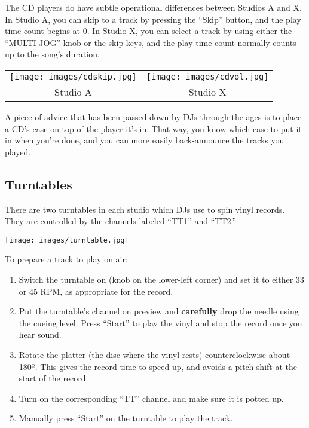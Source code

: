 \documentclass{witrman}
\begin{document}
The CD players do have subtle operational differences between Studios A and X.
In Studio A, you can skip to a track by pressing the ``Skip'' button, and the
play time count begins at 0.  In Studio X, you can select a track by using either the
``MULTI JOG'' knob or the skip keys, and the play time count normally counts up to the
song's duration.  

\begin{tabular}{cc}
    \texttt{[image: images/cdskip.jpg]} &
    \texttt{[image: images/cdvol.jpg]} \\

    Studio A &
    Studio X \\
\end{tabular}


A piece of advice that has been passed down by DJs through the ages is to place a
CD's case on top of the player it's in.  That way, you know which case to put it
in when you're done, and you can more easily back-announce the tracks you played.

\subsection{Turntables}

There are two turntables in each studio which DJs use to spin vinyl records.
They are controlled by the channels labeled ``TT1'' and ``TT2.''

\texttt{[image: images/turntable.jpg]}
\pagebreak

To prepare a track to play on air:
\begin{enumerate}
    \item Switch the turntable on (knob on the lower-left corner) and set it to
        either 33 or 45 RPM, as appropriate for the record.
    \item Put the turntable's channel on preview and \textbf{carefully} drop the
        needle using the cueing level.  Press ``Start'' to play the vinyl and
        stop the record once you hear sound.
    \item Rotate the platter (the disc where the vinyl rests) counterclockwise
        about 180º.  This gives the record time to speed up, and avoids a pitch
        shift at the start of the record.
    \item Turn on the corresponding ``TT'' channel and make sure it is potted
        up.
    \item Manually press ``Start'' on the turntable to play the track.
\end{enumerate}
\end{document}
